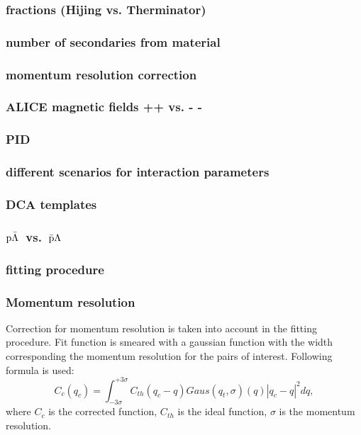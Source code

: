 \documentclass[ALICE,manyauthors]{ALICE_analysis_notes}
\newcommand{\pal}{$\rm p\bar{\rm \Lambda}$}
\newcommand{\apl}{$\bar{\rm p }\Lambda$}
\begin{document}
\subsubsection{ fractions (Hijing vs. Therminator)}
\subsubsection{ number of secondaries from material}
\subsubsection{ momentum resolution correction}
\subsubsection{ ALICE magnetic fields ++ vs. - - }
\subsubsection{ PID}
\subsubsection{ different scenarios for interaction parameters}
\subsubsection{ DCA templates}
\subsubsection{ \pal~vs.~\apl}
\subsubsection{ fitting procedure    }

\subsubsection{Momentum resolution}
Correction for momentum resolution is taken into account in the fitting procedure. Fit function is smeared with a gaussian function with the width corresponding the momentum resolution for the pairs of interest. Following formula is used:
\begin{equation}
  C_c(q_c) = \int_{-3\sigma}^{+3\sigma}C_{th}(q_c-q) Gaus(q_t, \sigma)(q) |q_c-q|^2 d q,
\end{equation}
where $C_c$ is the corrected function, $C_{th}$ is the ideal function, $\sigma$ is the momentum resolution.


\end{document}
